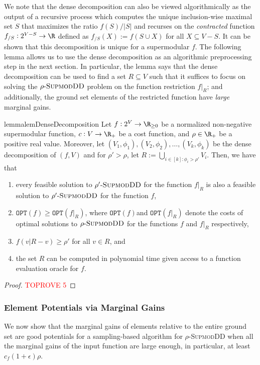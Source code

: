 \documentclass{article}
\newcommand{\OPT}{\ensuremath{\mathtt{OPT}}\xspace}
\newcommand{\supmoddensitydeletionset}{\textsc{SupmodDD}\xspace}
\newcommand{\sdds}{\ensuremath{\textsc{SupmodDD}}\xspace}
\newcommand{\rhosdds}[1]{\ensuremath{#1\text{-}\sdds}}
\begin{document}
We note that the dense decomposition can also be viewed algorithmically as the output of a recursive process which computes the unique inclusion-wise maximal set $S$ that maximizes the ratio $f(S)/|S|$ and recurses on the \emph{contracted} function $f_{/S}:2^{V - S}\rightarrow\R$ defined as $f_{/S}(X) := f(S\cup X)$ for all $X \subseteq V - S$. It can be shown that this decomposition is unique for a supermodular $f$.
The following lemma allows us to use the dense decomposition as an algorithmic preprocessing step in the next section. In particular, the lemma says that the dense decomposition can be used to find a set $R\subseteq V$ such that it suffices to focus on solving the \rhosdds{\rho} problem on the function restriction $f|_R$; and additionally, the ground set elements of the restricted function have \emph{large} marginal gains. 

\begin{restatable}{lemma}{lemDenseDecomposition}\label{lem:dense-decomposition}
    Let $f:2^V\rightarrow\R_{\geq 0}$ be a  normalized non-negative supermodular function, $c:V\rightarrow\R_{+}$ be a cost function,  and $\rho \in \R_+$ be a positive real value. Moreover, let $(V_1, \phi_1), (V_2, \phi_2), \ldots, (V_k, \phi_k)$ be the dense decomposition of $(f, V)$ and for $\rho'>\rho$, let $R := \bigcup_{i \in [k] : \phi_i > \rho'}V_i$. Then, we have that 
    \begin{enumerate}
        \item every feasible solution to \rhosdds{\rho'} for the function $f|_R$ is also a feasible solution to \rhosdds{\rho'} for the function  $f$,
        \item $\OPT(f) \geq  \OPT(f|_R)$,
where $\OPT(f)$and $ \OPT(f|_R)$ denote the costs of optimal solutions to $\rhosdds{\rho}$ for the functions $f$ and $f|_R$ respectively,
        \item $f(v|R-v) \geq \rho'$ for all $v \in R$, and  
        \item the set $R$ can be computed in polynomial time given access to a function evaluation oracle for $f$.
    \end{enumerate}
\end{restatable}
\begin{proof}\textcolor{red}{TOPROVE 5}\end{proof}




\subsubsection{Element Potentials via Marginal Gains}\label{sec:element-potentials}
We now show that the marginal gains of elements relative to the entire ground set are good potentials for a sampling-based algorithm for $\rho$-\supmoddensitydeletionset when all the marginal gains of the input function are large enough, in particular, at least $c_f(1+\epsilon)\rho$. 
\end{document}
